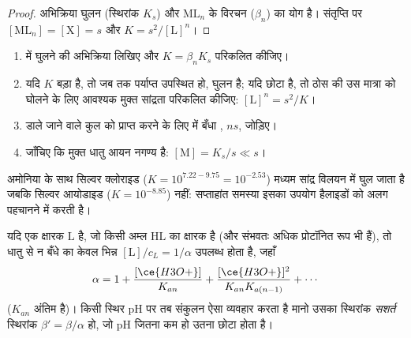 \begin{proof}
अभिक्रिया घुलन (स्थिरांक $K_s$) और
$\mathrm{ML}_n$ के विरचन ($\beta_n$) का योग है। संतृप्ति पर $[\mathrm{ML}_n]
= [\mathrm{X}] = s$ और $K = s^2/[\mathrm{L}]^n$।
\end{proof}

\begin{method}[संकुलन द्वारा अवक्षेप को घोलना]\label{met:b1:complexation:dissolve-precipitate}
\begin{enumerate}
  \item {} में घुलने की अभिक्रिया लिखिए और
        $K = \beta_n K_s$ परिकलित कीजिए।
  \item यदि $K$ बड़ा है, तो जब तक पर्याप्त  उपस्थित हो, घुलन  है;
        यदि छोटा है, तो ठोस की उस मात्रा को घोलने के लिए आवश्यक मुक्त 
        सांद्रता परिकलित कीजिए:
        $[\mathrm{L}]^n = s^2/K$।
  \item डाले जाने वाले कुल  को प्राप्त करने के लिए  में बँधा , $n s$,
        जोड़िए।
  \item जाँचिए कि मुक्त धातु आयन नगण्य है: $[\mathrm{M}] = K_s/s
        \ll s$।
\end{enumerate}
\end{method}

अमोनिया के साथ सिल्वर क्लोराइड ($K = 10^{7.22 - 9.75} = 10^{-2.53}$)
मध्यम सांद्र विलयन में घुल जाता है जबकि सिल्वर आयोडाइड
($K = 10^{-8.85}$) नहीं: सप्ताहांत समस्या इसका उपयोग
हैलाइडों को अलग पहचानने में करती है।

\begin{proposition}[संकुलन बनाम अम्लता]\label{prop:b1:complexation:ligand-acidity}
यदि  एक क्षारक $\mathrm{L}$ है, जो किसी अम्ल $\mathrm{HL}$ का क्षारक है (और
संभवतः अधिक प्रोटॉनित रूप भी हैं), तो धातु से न बँधे  का केवल
भिन्न $[\mathrm{L}]/c_L =
1/\alpha$ उपलब्ध होता है, जहाँ
\[
  \alpha = 1 + \frac{[\ce{H3O+}]}{K_{an}} + \frac{[\ce{H3O+}]^2}{K_{an}K_{a(n-1)}}
  + \cdots
\]
($K_{an}$ अंतिम  है)। किसी स्थिर pH पर तब संकुलन
ऐसा व्यवहार करता है मानो उसका स्थिरांक \emph{सशर्त} स्थिरांक
$\beta' = \beta/\alpha$ हो, जो pH जितना कम हो उतना छोटा होता है।
\end{proposition}

